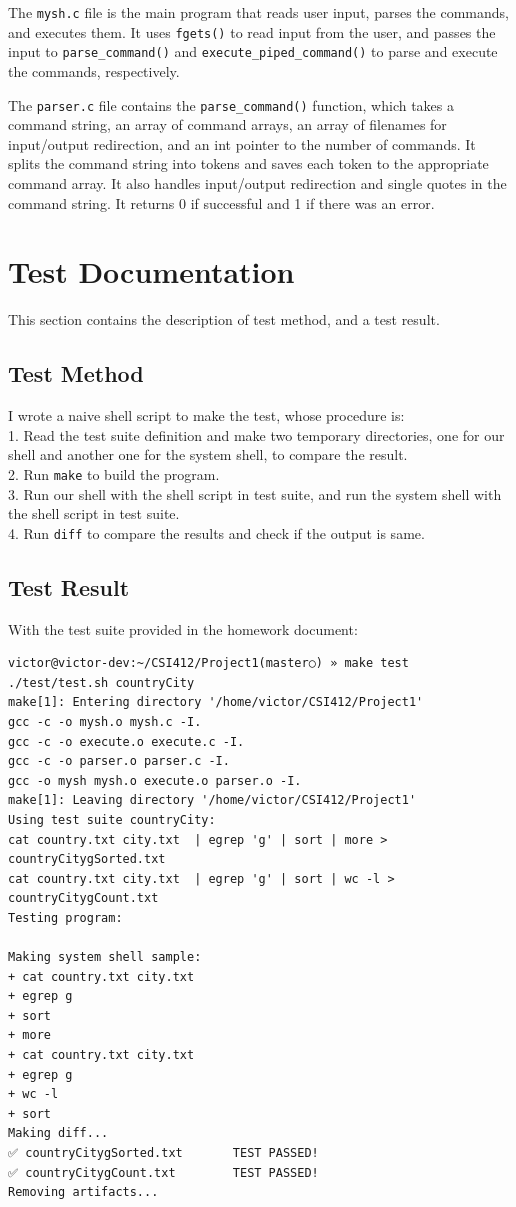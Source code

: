 \documentclass{article}
\begin{document}
The \texttt{mysh.c} file is the main program that reads user input, parses the commands, and executes them. It uses \texttt{fgets()} to read input from the user, and passes the input to \texttt{parse\_command()} and \texttt{execute\_piped\_command()} to parse and execute the commands, respectively.

The \texttt{parser.c} file contains the \texttt{parse\_command()} function, which takes a command string, an array of command arrays, an array of filenames for input/output redirection, and an int pointer to the number of commands. It splits the command string into tokens and saves each token to the appropriate command array. It also handles input/output redirection and single quotes in the command string. It returns 0 if successful and 1 if there was an error.

\section{Test Documentation}
This section contains the description of test method, and a test result.
\subsection{Test Method}
I wrote a naive shell script to make the test, whose procedure is: \\
1. Read the test suite definition and make two temporary directories, one for our shell and another one for the system shell, to compare the result. \\
2. Run \texttt{make} to build the program. \\
3. Run our shell with the shell script in test suite, and run the system shell with the shell script in test suite. \\
4. Run \texttt{diff} to compare the results and check if the output is same.

\subsection{Test Result}
With the test suite provided in the homework document:
\begin{verbatim}
victor@victor-dev:~/CSI412/Project1(master○) » make test 
./test/test.sh countryCity
make[1]: Entering directory '/home/victor/CSI412/Project1'
gcc -c -o mysh.o mysh.c -I.
gcc -c -o execute.o execute.c -I.
gcc -c -o parser.o parser.c -I.
gcc -o mysh mysh.o execute.o parser.o -I.
make[1]: Leaving directory '/home/victor/CSI412/Project1'
Using test suite countryCity:
cat country.txt city.txt  | egrep 'g' | sort | more > countryCitygSorted.txt
cat country.txt city.txt  | egrep 'g' | sort | wc -l > countryCitygCount.txt
Testing program: 

Making system shell sample: 
+ cat country.txt city.txt
+ egrep g
+ sort
+ more
+ cat country.txt city.txt
+ egrep g
+ wc -l
+ sort
Making diff...
✅ countryCitygSorted.txt       TEST PASSED!
✅ countryCitygCount.txt        TEST PASSED!
Removing artifacts...
\end{verbatim}
\end{document}

